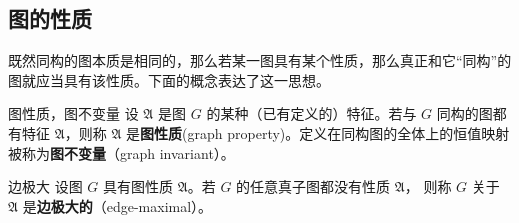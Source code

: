 \subsection{图的性质}
既然同构的图本质是相同的，那么若某一图具有某个性质，那么真正和它“同构”的图就应当具有该性质。下面的概念表达了这一思想。
\begin{definition}{图性质，图不变量}
设 $\mathfrak A$ 是图 $G$ 的某种（已有定义的）特征。若与 $G$ 同构的图都有特征 $\mathfrak A$，则称 $\mathfrak A$ 是\textbf{图性质}(graph property)。定义在同构图的全体上的恒值映射被称为\textbf{图不变量}（graph invariant）。
\end{definition}

\begin{definition}{边极大}
设图 $G$ 具有图性质 $\mathfrak A$。若 $G$ 的任意真子图都没有性质 $\mathfrak A$， 则称 $G$ 关于  $\mathfrak A$ 是\textbf{边极大的}（edge-maximal）。
\end{definition}

